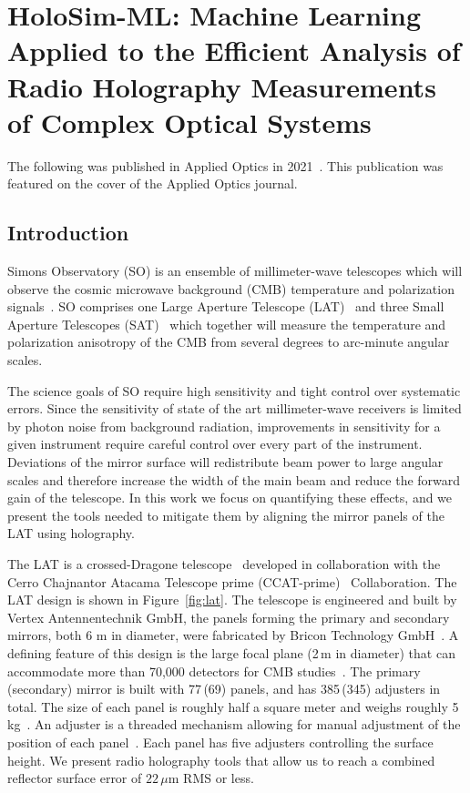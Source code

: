 \chapter{HoloSim-ML: Machine Learning Applied to the Efficient Analysis of Radio Holography Measurements of Complex Optical Systems}
\label{ch:holosim}
The following was published in Applied Optics in 2021~\cite{Chesmore:21}.  This publication was featured on the cover of the Applied Optics journal.
\section{Introduction}
Simons Observatory (SO) is an ensemble of millimeter-wave telescopes which will observe the cosmic microwave background (CMB) temperature and polarization signals~\cite{gali18, so19}. SO comprises one Large Aperture Telescope (LAT)~\cite{Niemack:16, Gudmundsson:21,Parshley_2018} and three Small Aperture Telescopes (SAT)~\cite{ali20} which together will measure the temperature and polarization anisotropy of the CMB from several degrees to arc-minute angular scales.

The science goals of SO require high sensitivity and tight control over systematic errors.  Since the sensitivity of state of the art millimeter-wave receivers is limited by photon noise from background radiation, improvements in sensitivity for a given instrument require careful control over every part of the instrument.  Deviations of the mirror surface will redistribute beam power to large angular scales and therefore increase the width of the main beam and reduce the forward gain of the telescope.  In this work we focus on quantifying these effects, and we present the tools needed to mitigate them by aligning the mirror panels of the LAT using holography.

The LAT is a crossed-Dragone telescope~\cite{6773968,Gudmundsson:21,Niemack:16,2021RNAAS...5..100X} developed in collaboration with the Cerro Chajnantor Atacama Telescope prime (CCAT-prime)~\cite{ccat,aravena2019ccatprime} Collaboration.  The LAT design is shown in Figure~\ref{fig:lat}.  The telescope is engineered and built by Vertex Antennentechnik GmbH, the panels forming the primary and secondary mirrors, both 6 m in diameter, were fabricated by Bricon Technology GmbH~\cite{vertex}.  A defining feature of this design is the large focal plane (2\,m in diameter) that can accommodate more than 70,000 detectors for CMB studies~\cite{Parshley_2018,2021ApJS25623Z,mccarrick2021simons}. The primary\,(secondary) mirror is built with 77\,(69) panels, and has 385\,(345) adjusters in total.  The size of each panel is roughly half a square meter and weighs roughly 5\,kg~\cite{ccat}.  An adjuster is a threaded mechanism allowing for manual adjustment of the position of each panel~\cite{Woody}.  Each panel has five adjusters controlling the surface height.  We present radio holography tools that allow us to reach a combined reflector surface error of $22\,\mu$m RMS or less.

